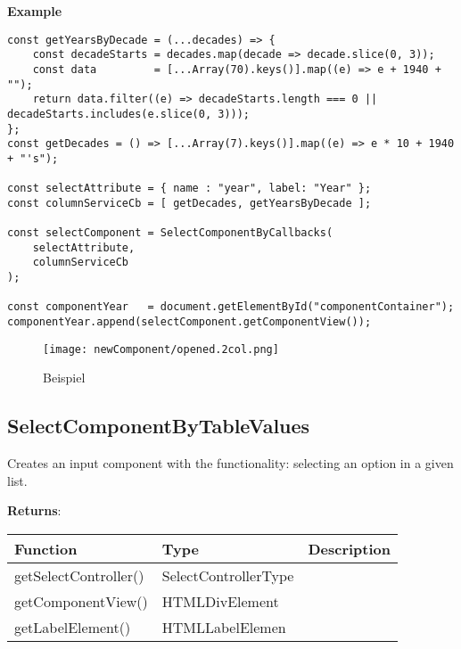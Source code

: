 \vspace*{6pt}
\noindent
\textbf{Example}

\begin{lstlisting}[style = htmlcssjs, label = api:selectComponentCbExample]
const getYearsByDecade = (...decades) => {
    const decadeStarts = decades.map(decade => decade.slice(0, 3));
    const data         = [...Array(70).keys()].map((e) => e + 1940 + "");
    return data.filter((e) => decadeStarts.length === 0 || decadeStarts.includes(e.slice(0, 3)));
};
const getDecades = () => [...Array(7).keys()].map((e) => e * 10 + 1940 + "'s");

const selectAttribute = { name : "year", label: "Year" };
const columnServiceCb = [ getDecades, getYearsByDecade ];

const selectComponent = SelectComponentByCallbacks(
    selectAttribute,
    columnServiceCb
);

const componentYear   = document.getElementById("componentContainer");
componentYear.append(selectComponent.getComponentView());
\end{lstlisting}
    
\begin{figure}[!htb]
    \centering
    \texttt{[image: newComponent/opened.2col.png]}
    \caption*{\centering Beispiel }
    \label{api:selectComponentCbImg}
\end{figure}


\clearpage
\subsection*{SelectComponentByTableValues}

\vspace*{6pt}
Creates an input component with the functionality: selecting an option in a given list. 

\vspace*{18pt}
\noindent
\textbf{Returns}: 

\begin{table}[!htb] 
    \label{api:selectComponentByTableValuesReturn}
    \footnotesize
    \setlength\extrarowheight{4pt}
    \begin{tabular}{ p{3.5cm} p{3.5cm} p{6cm} }
        \toprule[1.2pt]
        \textbf{Function}     & \textbf{Type}        & \textbf{Description} \\
        \midrule
        getSelectController() & SelectControllerType &  \\
        getComponentView()    & HTMLDivElement       &  \\
        getLabelElement()     & HTMLLabelElemen      &  \\
        \bottomrule[1.2pt]
    \end{tabular}
\end{table}

